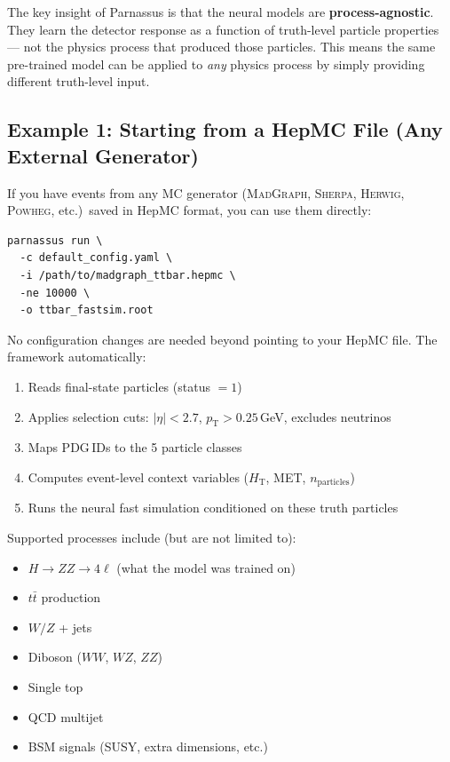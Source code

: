 \documentclass[11pt,a4paper]{article}
\begin{document}
The key insight of Parnassus is that the neural models are \textbf{process-agnostic}.
They learn the detector response as a function of truth-level particle properties ---
not the physics process that produced those particles. This means the same pre-trained
model can be applied to \emph{any} physics process by simply providing different
truth-level input.

\subsection{Example 1: Starting from a HepMC File (Any External Generator)}

If you have events from any MC generator (\textsc{MadGraph}, \textsc{Sherpa},
\textsc{Herwig}, \textsc{Powheg}, etc.)\ saved in HepMC format, you can use them
directly:

\begin{lstlisting}[style=bash,caption={Running fast simulation on externally produced HepMC events.}]
parnassus run \
  -c default_config.yaml \
  -i /path/to/madgraph_ttbar.hepmc \
  -ne 10000 \
  -o ttbar_fastsim.root
\end{lstlisting}

No configuration changes are needed beyond pointing to your HepMC file. The framework
automatically:

\begin{enumerate}
  \item Reads final-state particles (status $= 1$)
  \item Applies selection cuts: $|\eta| < 2.7$, $p_\mathrm{T} > 0.25$\,GeV,
    excludes neutrinos
  \item Maps PDG\,IDs to the 5 particle classes
  \item Computes event-level context variables ($H_\mathrm{T}$, MET, $n_\mathrm{particles}$)
  \item Runs the neural fast simulation conditioned on these truth particles
\end{enumerate}

\noindent
Supported processes include (but are not limited to):
\begin{itemize}
  \item $H \to ZZ \to 4\ell$ (what the model was trained on)
  \item $t\bar{t}$ production
  \item $W/Z$ + jets
  \item Diboson ($WW$, $WZ$, $ZZ$)
  \item Single top
  \item QCD multijet
  \item BSM signals (SUSY, extra dimensions, etc.)
\end{itemize}
\end{document}
